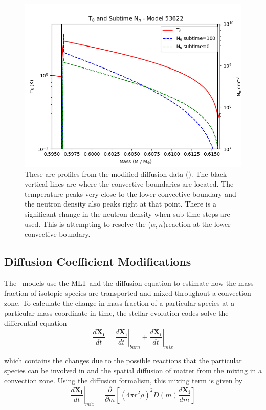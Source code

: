 \documentclass[fleqn,usenatbib]{mnras}
\begin{document}
\begin{figure}
   \includegraphics[width=1\columnwidth]{figs/T_Neutron_sub.png}
   \caption{These are profiles from the modified diffusion data (). The black vertical lines are where the convective boundaries are located. The temperature peaks very close to the lower convective boundary and the neutron density also peaks right at that point. There is a significant change in the neutron density when sub-time steps are used. This is attempting to resolve the \neon[22]($\alpha,n$)\magnesium[25] reaction at the lower convective boundary.}
\end{figure}

\subsection{Diffusion Coefficient Modifications}
\label{sec:diffusion}

The \MESA~models use the MLT and the diffusion equation to estimate how the mass fraction of isotopic species are transported and mixed throughout a convection zone. To calculate the change in mass fraction of a particular species at a particular mass coordinate in time, the stellar evolution codes solve the differential equation 
\begin{equation}
\frac{d\mathbf{X_{i}}}{dt} = \left. \frac{d\mathbf{X_{i}}}{dt} \right \rvert_{burn} + \left. \frac{d\mathbf{X_{i}}}{dt} \right \rvert_{mix}
\end{equation}

\noindent which contains the changes due to the possible reactions that the particular species can be involved in and the spatial diffusion of matter from the mixing in a convection zone. Using the diffusion formalism, this mixing term is given by
\begin{equation}
\left. \frac{d\mathbf{X_{i}}}{dt} \right \rvert_{mix} = \frac{\partial}{\partial m} [(4\pi r^{2} \rho)^{2} D(m) \frac{d\mathbf{X_{i}}}{dm}]
\label{eq:diffusion}
\end{equation} 
\end{document}

